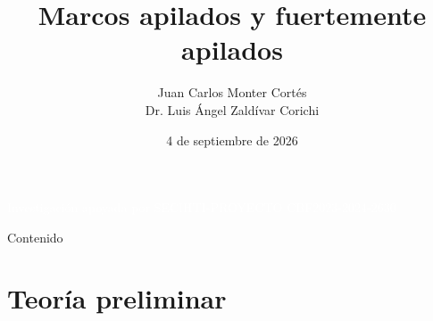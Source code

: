 \documentclass[compress,12pt]{beamer}
\title{Marcos apilados y fuertemente apilados}
\date{4 de septiembre de 2026}
\author{Juan Carlos Monter Cortés \\ Dr. Luis Ángel Zaldívar Corichi}
\institute{Universidad de Guadalajara}
\begin{document}

\begin{frame}[plain]
\titlepage

\vfill
\begin{center}
    \textcolor{white}{\scriptsize Investigación apoyada por SECIHTI-PROYECTO CBF2023-2024-2630}
\end{center}
\end{frame}

\begin{frame}{Contenido}
\tableofcontents
\end{frame}

\section{Teoría preliminar}
\end{document}
